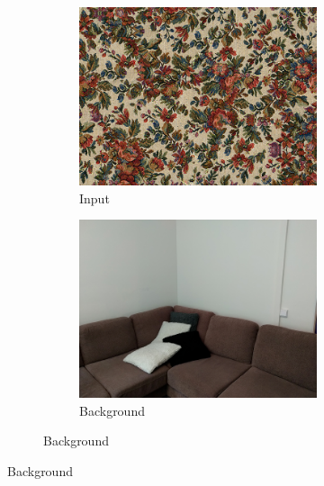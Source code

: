 \begin{figure}[]
    \centering    
    \begin{subfigure}{\textwidth}
        \centering
        \begin{subfigure}{0.24\textwidth}
            \centering
            \includegraphics[width=\textwidth]{images/04-experiment02/sofa/flowers/target.jpg}
            \caption*{Input}
        \end{subfigure}
        \hfill
        \begin{subfigure}{0.24\textwidth}
            \centering
            \includegraphics[width=\textwidth]{images/04-experiment02/sofa/bg.jpg}
            \caption*{Background}
        \end{subfigure}

\end{subfigure}
\end{figure}
